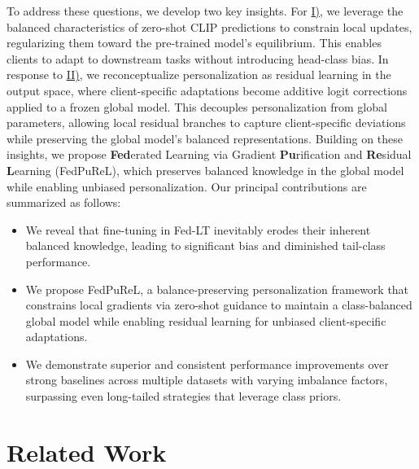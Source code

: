 \documentclass[10pt,twocolumn,letterpaper]{article}
\begin{document}
To address these questions, we develop two key insights. For \hyperlink{q1}{I)}, we leverage the balanced characteristics of zero-shot CLIP predictions to constrain local updates, regularizing them toward the pre-trained model's equilibrium. This enables clients to adapt to downstream tasks without introducing head-class bias. In response to \hyperlink{q2}{II)}, we reconceptualize personalization as residual learning in the output space, where client-specific adaptations become additive logit corrections applied to a frozen global model. This decouples personalization from global parameters, allowing local residual branches to capture client-specific deviations while preserving the global model's balanced representations. Building on these insights, we propose \textbf{Fed}erated Learning via Gradient \textbf{Pu}rification and \textbf{Re}sidual \textbf{L}earning (FedPuReL), which preserves balanced knowledge in the global model while enabling unbiased personalization. Our principal contributions are summarized as follows:

\begin{itemize}[leftmargin=*]
    \item[\ding{182}] We reveal that fine-tuning in Fed-LT inevitably erodes their inherent balanced knowledge, leading to significant bias and diminished tail-class performance.

    \item[\ding{183}] We propose FedPuReL, a balance-preserving personalization framework that constrains local gradients via zero-shot guidance to maintain a class-balanced global model while enabling residual learning for unbiased client-specific adaptations.
    
    \item[\ding{184}] We demonstrate superior and consistent performance improvements over strong baselines across multiple datasets with varying imbalance factors, surpassing even long-tailed strategies that leverage class priors.
\end{itemize}

\vspace{-0.5em}
\section{Related Work}
\end{document}
